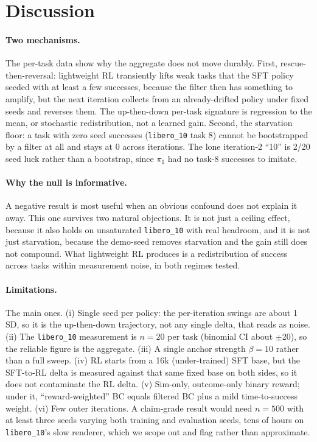 \documentclass[11pt]{article}
\newcommand{\libten}{\texttt{libero\_10}}
\begin{document}
\section{Discussion}
\label{sec:discussion}

\paragraph{Two mechanisms.}
The per-task data show why the aggregate does not move durably. First, rescue-then-reversal:
lightweight RL transiently lifts weak tasks that the SFT policy seeded with at least a few
successes, because the filter then has something to amplify, but the next iteration collects from an
already-drifted policy under fixed seeds and reverses them. The up-then-down per-task signature is
regression to the mean, or stochastic redistribution, not a learned gain. Second, the starvation
floor: a task with zero seed successes (\libten{} task 8) cannot be bootstrapped by a filter at all
and stays at 0 across iterations. The lone iteration-2 ``10'' is 2/20 seed luck rather than a
bootstrap, since $\pi_1$ had no task-8 successes to imitate.

\paragraph{Why the null is informative.}
A negative result is most useful when an obvious confound does not explain it away. This one
survives two natural objections. It is not just a ceiling effect, because it also holds on
unsaturated \libten{} with real headroom, and it is not just starvation, because the demo-seed
removes starvation and the gain still does not compound. What lightweight RL produces is a
redistribution of success across tasks within measurement noise, in both regimes tested.

\paragraph{Limitations.}
The main ones. (i) Single seed per policy: the per-iteration swings are about 1 SD, so it is the
up-then-down trajectory, not any single delta, that reads as noise. (ii) The \libten{} measurement
is $n{=}20$ per task (binomial CI about $\pm$20), so the reliable figure is the aggregate. (iii) A
single anchor strength $\beta{=}10$ rather than a full sweep. (iv) RL starts from a 16k
(under-trained) SFT base, but the SFT-to-RL delta is measured against that same fixed base on both
sides, so it does not contaminate the RL delta. (v) Sim-only, outcome-only binary reward; under it,
``reward-weighted'' BC equals filtered BC plus a mild time-to-success weight. (vi) Few outer
iterations. A claim-grade result would need $n{=}500$ with at least three seeds varying both
training and evaluation seeds, tens of hours on \libten{}'s slow renderer, which we scope out and
flag rather than approximate.
\end{document}
